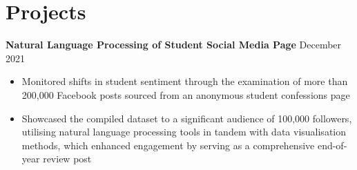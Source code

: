 \documentclass{article}
\begin{document}
\vspace{-0.75\baselineskip}
\hrulefill
\vspace{-0.75\baselineskip}

\section*{Projects}


\textbf{Natural Language Processing of Student Social Media Page} \hfill December 2021
\begin{itemize}
    \item Monitored shifts in student sentiment through the examination of more than 200,000 Facebook posts sourced from an anonymous student confessions page
    \item Showcased the compiled dataset to a significant audience of 100,000 followers, utilising natural language processing tools in tandem with data visualisation methods, which enhanced engagement by serving as a comprehensive end-of-year review post
\end{itemize} \medskip

\end{document}

